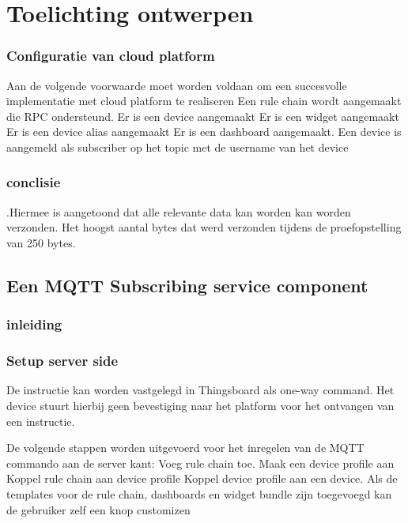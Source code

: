 		\chapter{Toelichting ontwerpen}
		
		
		
		\subsection{Configuratie van cloud platform}
		Aan de volgende voorwaarde moet worden voldaan om een succesvolle implementatie met cloud platform te realiseren
		Een rule chain wordt aangemaakt die RPC ondersteund.
		Er is een device aangemaakt
		Er is een widget aangemaakt
		Er is een device alias aangemaakt
		Er is een dashboard aangemaakt.
		Een device is aangemeld als subscriber op het topic met de username van het device
		
	 
		
	 
		
		\subsection{conclisie}
		.Hiermee is aangetoond dat alle relevante data kan worden kan worden verzonden. Het hoogst aantal bytes dat werd verzonden tijdens de proefopstelling van 250 bytes.
		 
		\section{Een MQTT Subscribing service component}
		
		\subsection{inleiding}
		 
		 
		\subsection{Setup server side}
		De instructie kan worden vastgelegd in Thingsboard als one-way command. Het device stuurt hierbij geen bevestiging naar het platform voor het ontvangen van een instructie.
		
		De volgende stappen worden uitgevoerd voor het inregelen van de MQTT commando aan de server kant:
		Voeg rule chain toe.
		Maak een device profile aan
		Koppel rule chain aan device profile
		Koppel device profile aan een device.
		Als de templates voor de rule chain, dashboards en widget bundle zijn toegevoegd kan de gebruiker zelf een knop customizen
		
